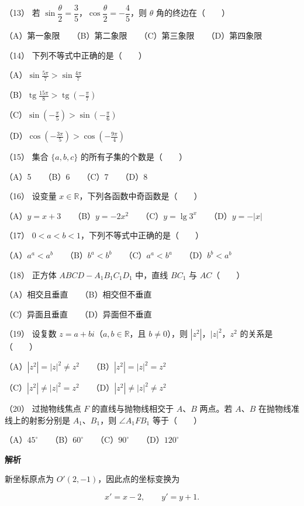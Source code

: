 \begin{answer}
（13） 若 $\sin\dfrac\theta2=\dfrac35$，$\cos\dfrac\theta2=-\dfrac45$，则 $\theta$ 角的终边在\mbox{（　　）}

（A）第一象限　　（B）第二象限　　（C）第三象限　　（D）第四象限

（14） 下列不等式中正确的是\mbox{（　　）}

（A）$\sin\frac{5\pi}7>\sin\frac{4\pi}7$

（B）$\operatorname{tg}\frac{15\pi}8>\operatorname{tg}\left(-\frac\pi7\right)$

（C）$\sin\left(-\frac\pi5\right)>\sin\left(-\frac\pi6\right)$

（D）$\cos\left(-\frac{3\pi}5\right)>\cos\left(-\frac{9\pi}4\right)$

（15） 集合 $\{a,b,c\}$ 的所有子集的个数是\mbox{（　　）}

（A）5　　（B）6　　（C）7　　（D）8

（16） 设变量 $x\in\mathbb R$，下列各函数中奇函数是\mbox{（　　）}

（A）$y=x+3$　　（B）$y=-2x^2$　　（C）$y=\lg 3^x$　　（D）$y=-|x|$

（17） $0<a<b<1$，下列不等式中正确的是\mbox{（　　）}

（A）$a^a<a^b$　　（B）$b^a<b^b$　　（C）$a^a<b^a$　　（D）$b^b<a^b$

（18） 正方体 $ABCD-A_1B_1C_1D_1$ 中，直线 $BC_1$ 与 $AC$\mbox{（　　）}

（A）相交且垂直　　（B）相交但不垂直

（C）异面且垂直　　（D）异面但不垂直

（19） 设复数 $z=a+bi$（$a,b\in\mathbb R$，且 $b\ne0$），则 $|z^2|$，$|z|^2$，$z^2$ 的关系是\mbox{（　　）}

（A）$|z^2|=|z|^2\ne z^2$　　（B）$|z^2|=|z|^2=z^2$

（C）$|z^2|\ne|z|^2=z^2$　　（D）$|z^2|\ne|z|^2\ne z^2$

（20） 过抛物线焦点 $F$ 的直线与抛物线相交于 $A\text{、}B$ 两点。若 $A\text{、}B$ 在抛物线准线上的射影分别是 $A_1\text{、}B_1$，则 $\angle A_1FB_1$ 等于\mbox{（　　）}

（A）$45^\circ$　　（B）$60^\circ$　　（C）$90^\circ$　　（D）$120^\circ$

\textbf{解析}


新坐标原点为 $O'(2,-1)$，因此点的坐标变换为

\nopagebreak[4]
\[
x'=x-2,\qquad y'=y+1.
\]


\end{answer}
